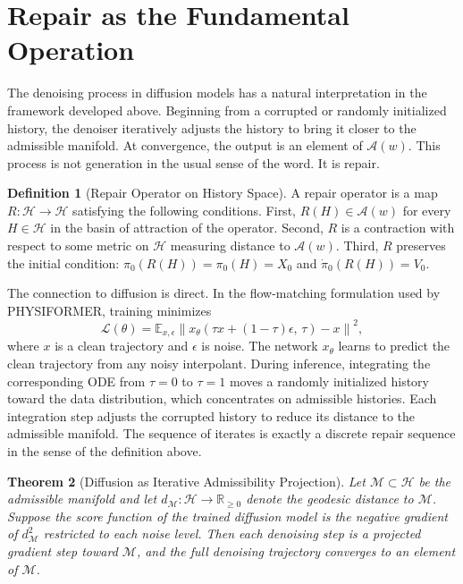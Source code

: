 \documentclass[12pt,oneside]{article}
\newtheorem{theorem}{Theorem}[section]
\theoremstyle{definition}
\newtheorem{definition}[theorem]{Definition}
\newcommand{\A}{\mathcal{A}}
\newcommand{\H}{\mathcal{H}}
\newcommand{\Mca}{\mathcal{M}}
\begin{document}
\section{Repair as the Fundamental Operation}

The denoising process in diffusion models has a natural interpretation in the framework
developed above. Beginning from a corrupted or randomly initialized history, the denoiser
iteratively adjusts the history to bring it closer to the admissible manifold. At
convergence, the output is an element of \(\A(w)\). This process is not generation
in the usual sense of the word. It is repair.

\begin{definition}[Repair Operator on History Space]
A repair operator is a map \(R : \H \to \H\) satisfying the following conditions.
First, \(R(H) \in \A(w)\) for every \(H \in \H\) in the basin of attraction of the
operator. Second, \(R\) is a contraction with respect to some metric on \(\H\)
measuring distance to \(\A(w)\). Third, \(R\) preserves the initial condition:
\(\pi_0(R(H)) = \pi_0(H) = X_0\) and \(\dot\pi_0(R(H)) = V_0\).
\end{definition}

The connection to diffusion is direct. In the flow-matching formulation used by
PHYSIFORMER, training minimizes
\[
\mathcal{L}(\theta) = \mathbb{E}_{x, \epsilon}\left\| x_\theta(\tau x + (1-\tau)\epsilon,\, \tau) - x \right\|^2,
\]
where \(x\) is a clean trajectory and \(\epsilon\) is noise. The network \(x_\theta\)
learns to predict the clean trajectory from any noisy interpolant. During inference,
integrating the corresponding ODE from \(\tau = 0\) to \(\tau = 1\) moves a randomly
initialized history toward the data distribution, which concentrates on admissible
histories. Each integration step adjusts the corrupted history to reduce its distance
to the admissible manifold. The sequence of iterates is exactly a discrete repair
sequence in the sense of the definition above.

\begin{theorem}[Diffusion as Iterative Admissibility Projection]
Let \(\Mca \subset \H\) be the admissible manifold and let \(d_\Mca : \H \to \mathbb{R}_{\geq 0}\)
denote the geodesic distance to \(\Mca\). Suppose the score function of the trained
diffusion model is the negative gradient of \(d_\Mca^2\) restricted to each noise level.
Then each denoising step is a projected gradient step toward \(\Mca\), and the full
denoising trajectory converges to an element of \(\Mca\).
\end{theorem}
\end{document}
